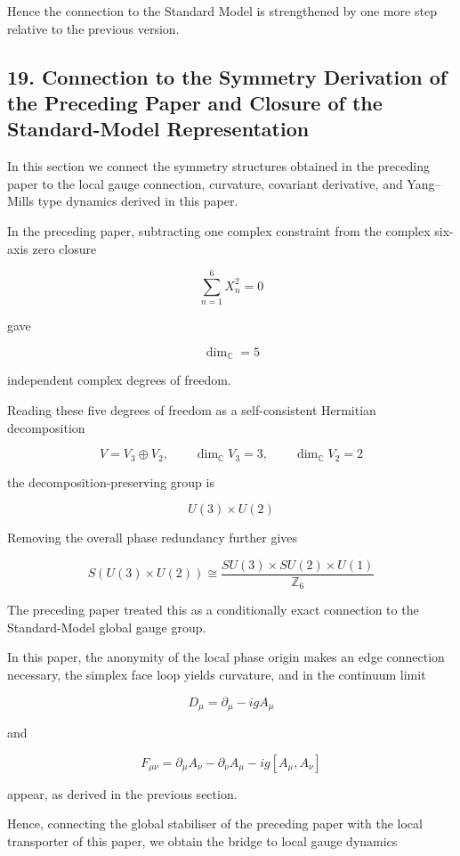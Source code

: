 \documentclass[
  a4paper,
]{article}
\begin{document}
Hence the connection to the Standard Model is strengthened by one more
step relative to the previous version.

\subsection{19. Connection to the Symmetry Derivation of the Preceding
Paper and Closure of the Standard-Model
Representation}\label{connection-to-the-symmetry-derivation-of-the-preceding-paper-and-closure-of-the-standard-model-representation}

In this section we connect the symmetry structures obtained in the
preceding paper to the local gauge connection, curvature, covariant
derivative, and Yang--Mills type dynamics derived in this paper.

In the preceding paper, subtracting one complex constraint from the
complex six-axis zero closure

\[
\sum_{n=1}^{6}X_n^2=0
\]

gave

\[
\boxed{
\dim_{\mathbb C}=5
}
\tag{95}
\]

independent complex degrees of freedom.

Reading these five degrees of freedom as a self-consistent Hermitian
decomposition

\[
\boxed{
V=V_3\oplus V_2,
\qquad
\dim_{\mathbb C}V_3=3,
\qquad
\dim_{\mathbb C}V_2=2
}
\tag{96}
\]

the decomposition-preserving group is

\[
U(3)\times U(2)
\]

Removing the overall phase redundancy further gives

\[
\boxed{
S(U(3)\times U(2))
\cong
\frac{
SU(3)\times SU(2)\times U(1)
}{
\mathbb Z_6
}
}
\tag{97}
\]

The preceding paper treated this as a conditionally exact connection to
the Standard-Model global gauge group.

In this paper, the anonymity of the local phase origin makes an edge
connection necessary, the simplex face loop yields curvature, and in the
continuum limit

\[
D_\mu
=
\partial_\mu-igA_\mu
\]

and

\[
F_{\mu\nu}
=
\partial_\mu A_\nu-\partial_\nu A_\mu-ig[A_\mu,A_\nu]
\]

appear, as derived in the previous section.

Hence, connecting the global stabiliser of the preceding paper with the
local transporter of this paper, we obtain the bridge to local gauge
dynamics
\end{document}
